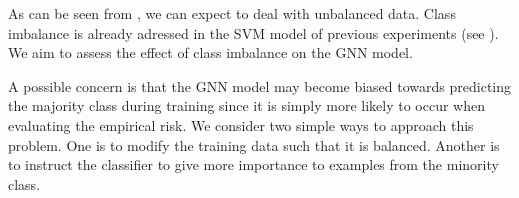\documentclass[
	fontsize=10pt, %
	twoside=false, %
	secnumdepth=1, %
  toc=indentunnumbered %
]{kaobook}
\begin{document}





As can be seen from , we can expect to deal with unbalanced
data. Class imbalance is already adressed in the SVM model of previous
experiments (see ). We aim to assess the effect of
class imbalance on the GNN model.

A possible concern is that the GNN model may become biased towards predicting
the majority class during training since it is simply more likely to occur when
evaluating the empirical risk.
%
We consider two simple ways to approach this problem. One is to modify the
training data such that it is balanced. Another is to instruct the classifier to
give more importance to examples from the minority class.


\end{document}
